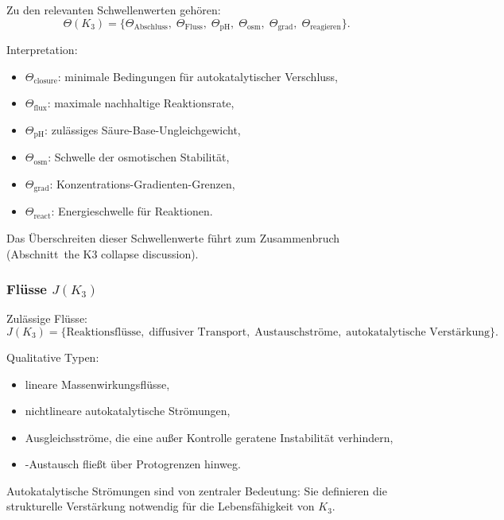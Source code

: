 Zu den relevanten Schwellenwerten gehören:
\[
\Theta(K_3) =
\{\Theta_{\mathrm{Abschluss}},\;
  \Theta_{\mathrm{Fluss}},\;
  \Theta_{\mathrm{pH}},\;
  \Theta_{\mathrm{osm}},\;
  \Theta_{\mathrm{grad}},\;
  \Theta_{\mathrm{reagieren}}\}.
\]

Interpretation:
\begin{itemize}
    \item $\Theta_{\mathrm{closure}}$: minimale Bedingungen für
          autokatalytischer Verschluss,
    \item $\Theta_{\mathrm{flux}}$: maximale nachhaltige Reaktionsrate,
    \item $\Theta_{\mathrm{pH}}$: zulässiges Säure-Base-Ungleichgewicht,
    \item $\Theta_{\mathrm{osm}}$: Schwelle der osmotischen Stabilität,
    \item $\Theta_{\mathrm{grad}}$: Konzentrations-Gradienten-Grenzen,
    \item $\Theta_{\mathrm{react}}$: Energieschwelle für Reaktionen.
\end{itemize}

Das Überschreiten dieser Schwellenwerte führt zum Zusammenbruch (Abschnitt~the K3 collapse discussion).

\subsubsection{Flüsse \texorpdfstring{$J(K_3)$}{J(K_3)}}

Zulässige Flüsse:
\[
J(K_3) = \{\text{Reaktionsflüsse},\; \text{diffusiver Transport},\;
         \text{Austauschströme},\; \text{autokatalytische Verstärkung}\}.
\]

Qualitative Typen:
\begin{itemize}
    \item lineare Massenwirkungsflüsse,
    \item nichtlineare autokatalytische Strömungen,
    \item Ausgleichsströme, die eine außer Kontrolle geratene Instabilität verhindern,
    \item-Austausch fließt über Protogrenzen hinweg.
\end{itemize}

Autokatalytische Strömungen sind von zentraler Bedeutung: Sie definieren die strukturelle Verstärkung
notwendig für die Lebensfähigkeit von $K_3$.

